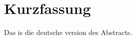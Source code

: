 \cleardoubleoddpage

\chapter*{Kurzfassung}
\thispagestyle{empty} %
Das is die deutsche version des Abstracts.